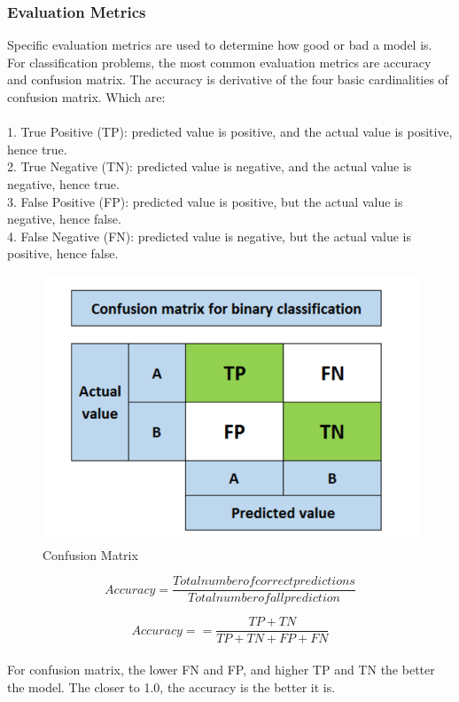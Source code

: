 \documentclass[conference]{IEEEtran}
\begin{document}
\subsubsection{Evaluation Metrics}
Specific evaluation metrics are used to determine how good or bad a model is. For classification problems, the most common evaluation metrics are accuracy and confusion matrix. The accuracy is derivative of the four basic cardinalities of confusion matrix. Which are:\\
\\
1. True Positive (TP): predicted value is positive, and the actual value is positive, hence true.\\
2. True Negative (TN): predicted value is negative, and the actual value is negative, hence true.\\
3. False Positive (FP): predicted value is positive, but the actual value is negative, hence false.\\
4. False Negative (FN): predicted value is negative, but the actual value is positive, hence false.\\

\begin{figure}[h]
    \centering
    \includegraphics[scale=0.57]{figs/confusionMatrix.png}
    \caption{Confusion Matrix}
    \label{dabc}        
\end{figure}

\begin{equation} 
\label{equ4}
Accuracy = \frac{Totalnumberofcorrectpredictions}{Totalnumberofallprediction}
\end{equation}

\begin{equation} 
\label{equ5}
Accuracy = = \frac{TP + TN}{TP + TN + FP + FN}
\end{equation}
\\
For confusion matrix, the lower FN and FP, and higher TP and TN the better the model. The closer to 1.0, the accuracy is the better it is.\\
\end{document}

